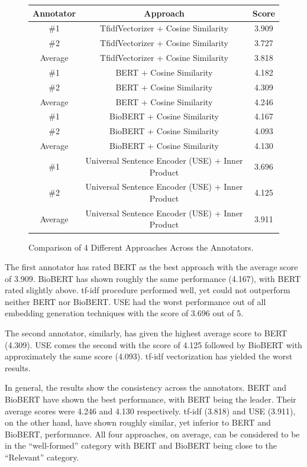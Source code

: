 \documentclass[sigconf,natbib=false]{acmart}
\begin{document}
\begin{figure}[H]
  \small
  \begin{tabular}{*{3}{c}}
    \toprule
    Annotator & Approach & Score\\
    \midrule
    \#1 & TfidfVectorizer + Cosine Similarity & 3.909\\
    \midrule
    \#2 & TfidfVectorizer + Cosine Similarity & 3.727\\
    \midrule
    Average & TfidfVectorizer + Cosine Similarity & 3.818\\
    \midrule
    \#1 & BERT + Cosine Similarity & 4.182\\
    \midrule
    \#2 & BERT + Cosine Similarity & 4.309\\
    \midrule
    Average & BERT + Cosine Similarity & 4.246\\
    \midrule
    \#1 & BioBERT + Cosine Similarity & 4.167\\
    \midrule
    \#2 & BioBERT + Cosine Similarity & 4.093\\
    \midrule
    Average & BioBERT + Cosine Similarity & 4.130\\
    \midrule
    \#1 & Universal Sentence Encoder (USE) + Inner Product & 3.696\\
    \midrule
    \#2 & Universal Sentence Encoder (USE) + Inner Product & 4.125\\
    \midrule
    Average & Universal Sentence Encoder (USE) + Inner Product & 3.911\\
    \bottomrule
  \end{tabular}
  \caption{Comparison of 4 Different Approaches Across the Annotators.}
\end{figure}

\noindent The first annotator has rated BERT as the best approach with the
average score of 3.909. BioBERT has shown roughly the same performance (4.167),
with BERT rated slightly above. tf-idf procedure performed well, yet could not
outperform neither BERT nor BioBERT. USE had the worst performance out of all
embedding generation techniques with the score of 3.696 out of 5.

\bigskip

\noindent The second annotator, similarly, has given the highest average score
to BERT (4.309). USE comes the second with the score of 4.125 followed by
BioBERT with approximately the same score (4.093). tf-idf vectorization has
yielded the worst results.

\bigskip

\noindent In general, the results show the consistency across the annotators.
BERT and BioBERT have shown the best performance, with BERT being the leader.
Their average scores were 4.246 and 4.130 respectively. tf-idf (3.818) and USE
(3.911), on the other hand, have shown roughly similar, yet inferior to BERT
and BioBERT, performance. All four approaches, on average, can be considered to
be in the ``well-formed'' category with BERT and BioBERT being close to the
``Relevant'' category.
\end{document}
